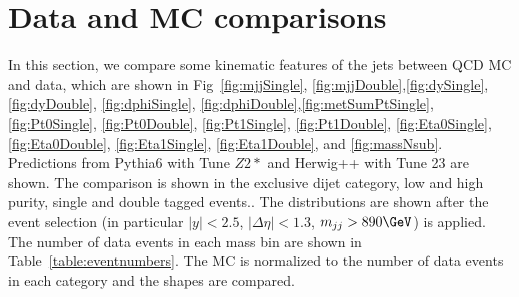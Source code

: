 \newpage
\section{Data and MC comparisons}
\label{sec:data-mc-comp}

In this section, we compare some kinematic features of the jets between QCD MC and data, which are
 shown in Fig~\ref{fig:mjjSingle}, \ref{fig:mjjDouble},\ref{fig:dySingle}, \ref{fig:dyDouble}, \ref{fig:dphiSingle}, 
\ref{fig:dphiDouble},\ref{fig:metSumPtSingle},
\ref{fig:Pt0Single}, \ref{fig:Pt0Double}, \ref{fig:Pt1Single}, \ref{fig:Pt1Double},
\ref{fig:Eta0Single}, \ref{fig:Eta0Double}, \ref{fig:Eta1Single}, \ref{fig:Eta1Double},
and \ref{fig:massNsub}.
Predictions from Pythia6 with Tune $Z2*$ and Herwig++ with Tune 23 are shown.
The comparison is shown in the exclusive dijet category, low and high purity,  single and double tagged events..
The distributions are shown after the event selection (in particular $|y| < 2.5$, $|\Delta\eta|<1.3$, $m_{jj} > 890  \GeVcc$) is applied.
The number of data events in each mass bin are shown in Table~\ref{table:eventnumbers}.
The MC is normalized to the number of data events in each category and the shapes are compared.


